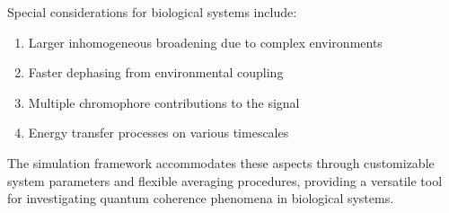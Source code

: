 \noindent
Special considerations for biological systems include:

\begin{enumerate}
	\item Larger inhomogeneous broadening due to complex environments
	\item Faster dephasing from environmental coupling
	\item Multiple chromophore contributions to the signal
	\item Energy transfer processes on various timescales
\end{enumerate}

\noindent
The simulation framework accommodates these aspects through customizable system parameters and flexible averaging procedures, providing a versatile tool for investigating quantum coherence phenomena in biological systems.